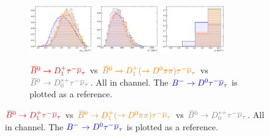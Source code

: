\begin{figure}[!htb]
    \begin{subfigure}{\textwidth}
        \centering
        \includegraphics[width=0.3\textwidth]{figs-fit-fit-templates/histo-comp/D0_iso_D0Tau__vs__D0_iso_D1ststTau__vs__D0_iso_D1ststTauD0PiPi__vs__D0_iso_D0ststTau__m2miss.pdf}
        \includegraphics[width=0.3\textwidth]{figs-fit-fit-templates/histo-comp/D0_iso_D0Tau__vs__D0_iso_D1ststTau__vs__D0_iso_D1ststTauD0PiPi__vs__D0_iso_D0ststTau__el.pdf}
        \includegraphics[width=0.3\textwidth]{figs-fit-fit-templates/histo-comp/D0_iso_D0Tau__vs__D0_iso_D1ststTau__vs__D0_iso_D1ststTauD0PiPi__vs__D0_iso_D0ststTau__q2.pdf}
        \caption{
            $\textcolor{red}{{{\kern 0.18em\overline{\kern -0.18em B}}{}^0} \rightarrow {\ensuremath{D}}_1^+{\tau^-}{{\overline{\nu}}_\tau}}$
            vs
            $\textcolor{orange}{{{\kern 0.18em\overline{\kern -0.18em B}}{}^0} \rightarrow {\ensuremath{D}}_1^+ (\rightarrow {\ensuremath{{D}^0}}\pi\pi) {\tau^-}{{\overline{\nu}}_\tau}}$
            vs
            $\textcolor{gray}{\Bzb \rightarrow \D_0^{*+}\taum\neutb}$.
            All in \Dz channel.
            The $\textcolor{blue}{{{{B}^-}} \rightarrow {\ensuremath{{D}^0}}{\ensuremath{\tau^-}}{\ensuremath{{\overline{\nu}}_\tau}}}$ is plotted
            as a reference.
        }
    \end{subfigure}


\end{figure}
